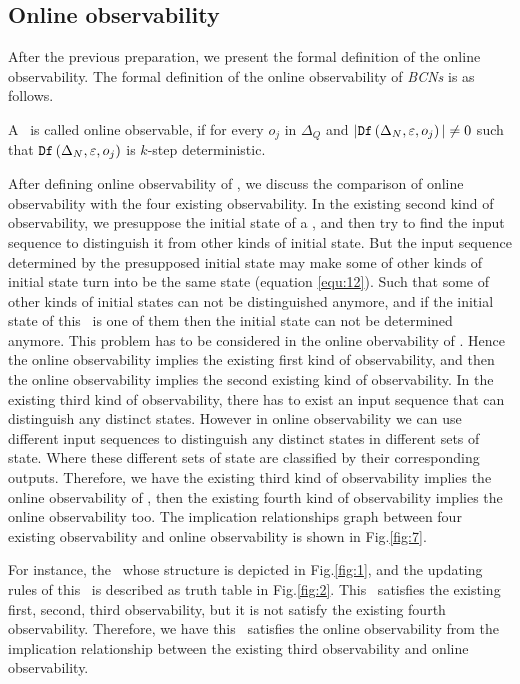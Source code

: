 \subsection{Online observability}
After the previous preparation, we present the formal definition of the online observability. The formal definition of the online observability of {\em BCNs} is as follows.
\begin{definition}
 A \BCN\ is called online observable,
if for every  $o_j$ in $\Delta_Q$ and $|{\tt Df}\left(\Delta_N,\varepsilon, o_j\right)|\neq 0$ such that ${\tt Df}\left(\Delta_N,\varepsilon,o_j\right)$ is $k$-step deterministic.
\end{definition}


After defining online observability of \BCNs, we discuss the comparison of online observability with the four existing observability. In the existing second kind of observability, we presuppose the initial state of a \BCN, and then try to find the input sequence to distinguish it from other kinds of initial state. But the input sequence determined by the presupposed initial state may make some of other kinds of initial state turn into be the same state (equation \ref{equ:12}). Such that some of other kinds of initial states can not be distinguished anymore, and if the initial state of this \BCN\ is one of them then the initial state can not be determined anymore. This problem has to be considered in the online obervability of \BCNs. Hence the online observability implies the existing first kind of observability, and then the online observability implies the second existing kind of observability. In the existing third kind of observability, there has to exist an input sequence that can distinguish any distinct states. However in online observability we can use different input sequences to distinguish any distinct states in different sets of state. Where these different sets of state are classified by their corresponding outputs. Therefore, we have the existing third kind of observability implies the online observability of \BCNs, then the existing fourth kind of observability implies the online observability too. The implication relationships graph between four existing observability and online observability is shown in Fig.\ref{fig:7}.
\begin{example}
For instance, the \BCN\ whose structure is depicted in Fig.\ref{fig:1}, and the updating rules of this \BCN\ is described as truth table in Fig.\ref{fig:2}. This \BCN\ satisfies the existing first, second, third observability, but it is not satisfy the existing fourth observability. Therefore, we have this \BCN\ satisfies the online observability from the implication relationship between the existing third observability and online observability.
\end{example}   

